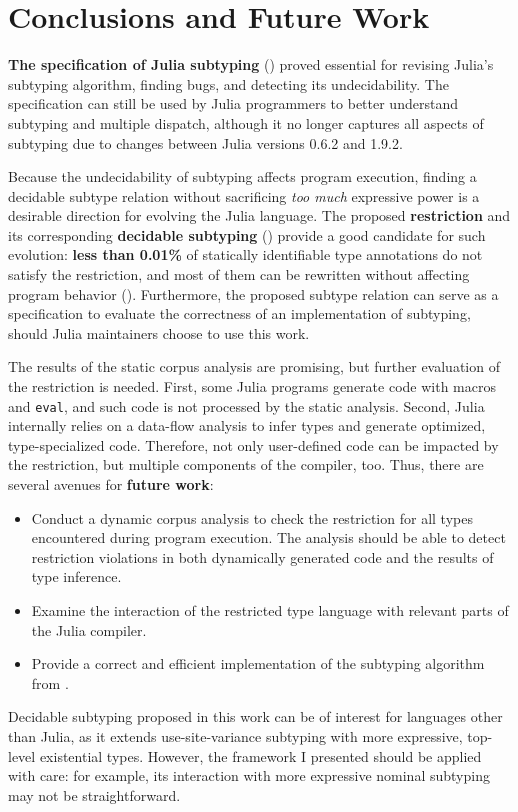 \chapter{Conclusions and Future Work}

\textbf{The specification of Julia subtyping}
()
proved essential for revising Julia's subtyping algorithm, 
finding bugs, and detecting its undecidability.
The specification can still be used by Julia programmers to better understand
subtyping and multiple dispatch, although it no longer captures all aspects of 
subtyping due to changes between Julia versions 0.6.2 and 1.9.2.

Because the undecidability of subtyping affects program execution,
finding a decidable subtype relation without sacrificing \emph{too much}
expressive power is a desirable direction for evolving the Julia language.
The proposed \textbf{restriction} and its corresponding 
\textbf{decidable subtyping} ()
provide a good candidate for such evolution: 
\textbf{less than 0.01\%} of statically
identifiable type annotations do not satisfy the restriction, and most of them
can be rewritten without affecting program behavior
().
Furthermore, the proposed subtype relation can serve as a specification
to evaluate the correctness of an implementation of subtyping,
should Julia maintainers choose to use this work.

The results of the static corpus analysis are promising,
but further evaluation of the restriction is needed. 
First, some Julia programs generate code with macros and \texttt{eval},
and such code is not processed by the static analysis.
Second, Julia internally relies on a data-flow analysis
to infer types and generate optimized, type-specialized code. Therefore,
not only user-defined code can be impacted by the restriction, but multiple 
components of the compiler, too. 
Thus, there are several avenues for \textbf{future work}:
\begin{itemize}
    \item Conduct a dynamic corpus analysis to check the restriction for all
        types encountered during program execution. The analysis should be able
        to detect restriction violations in both dynamically generated code
        and the results of type inference.
    \item Examine the interaction of the restricted type language 
        with relevant parts of the Julia compiler.
    \item Provide a correct and efficient implementation of the subtyping
        algorithm from .
\end{itemize}

Decidable subtyping proposed in this work can be of interest for
languages other than Julia, as it extends use-site-variance subtyping 
with more expressive, top-level existential types.
However, the framework I presented should be applied with care:
for example, its interaction with more expressive nominal subtyping
may not be straightforward.
